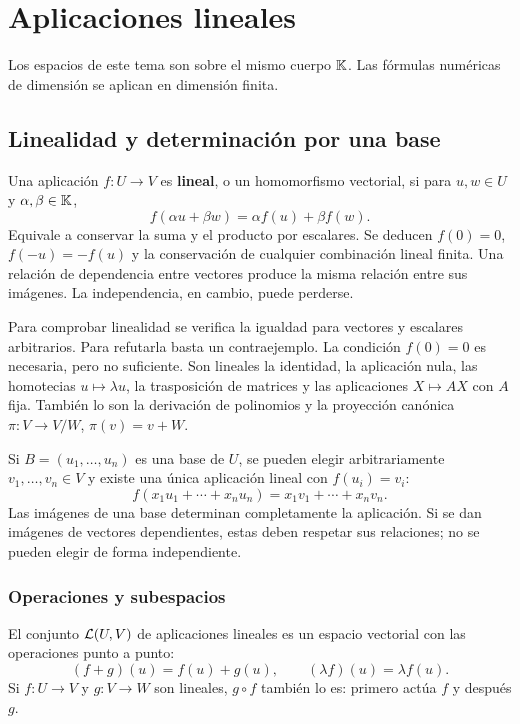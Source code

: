 \chapter{Aplicaciones lineales}
\label{cap:aplicaciones}

Los espacios de este tema son sobre el mismo cuerpo $\mathbb{K}$.
Las fórmulas numéricas de dimensión se aplican en dimensión finita.

\section{Linealidad y determinación por una base}
\label{sec:linealidad}

Una aplicación $f:U\to V$ es \textbf{lineal}, o un homomorfismo vectorial,
si para $u,w\in U$ y $\alpha,\beta\in\mathbb{K}$,
\[
 f(\alpha u+\beta w)=\alpha f(u)+\beta f(w).
\]
Equivale a conservar la suma y el producto por escalares.
Se deducen $f(0)=0$, $f(-u)=-f(u)$ y la conservación de cualquier
combinación lineal finita. Una relación de dependencia entre vectores
produce la misma relación entre sus imágenes. La independencia,
en cambio, puede perderse.

Para comprobar linealidad se verifica la igualdad para vectores y escalares
arbitrarios. Para refutarla basta un contraejemplo. La condición $f(0)=0$
es necesaria, pero no suficiente.
Son lineales la identidad, la aplicación nula, las homotecias $u\mapsto\lambda u$,
la trasposición de matrices y las aplicaciones $X\mapsto AX$ con $A$ fija.
También lo son la derivación de polinomios y la proyección canónica
$\pi:V\to V/W$, $\pi(v)=v+W$.

Si $B=(u_1,\ldots,u_n)$ es una base de $U$, se pueden elegir arbitrariamente
$v_1,\ldots,v_n\in V$ y existe una única aplicación lineal con $f(u_i)=v_i$:
\[
 f(x_1u_1+\cdots+x_nu_n)=x_1v_1+\cdots+x_nv_n.
\]
Las imágenes de una base determinan completamente la aplicación.
Si se dan imágenes de vectores dependientes, estas deben respetar sus
relaciones; no se pueden elegir de forma independiente.

\subsection*{Operaciones y subespacios}

El conjunto $\mathcal{L}(U,V)$ de aplicaciones lineales es un espacio vectorial
con las operaciones punto a punto:
\[
 (f+g)(u)=f(u)+g(u),\qquad (\lambda f)(u)=\lambda f(u).
\]
Si $f:U\to V$ y $g:V\to W$ son lineales, $g\circ f$ también lo es:
primero actúa $f$ y después $g$.

